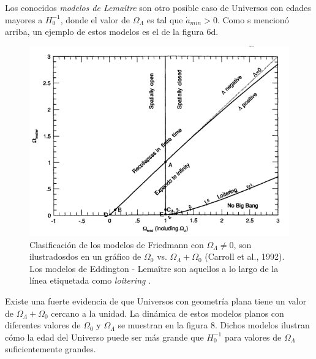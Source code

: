\documentclass[11pt]{article}
\begin{document}
{\begin{itemize}
       Los conocidos {\textit{modelos de Lema\^itre}} son otro posible caso de Universos con edades mayores a $H_0^{-1}$, donde el valor de $\Omega_{\Lambda}$ es tal que $\dot{a}_{min} >0$. Como s mencionó arriba, un ejemplo de estos modelos es el de la figura 6d. 
    \end{itemize}
    
    
    \begin{figure}[H]         
     \centering
     \includegraphics[width=1.0\textwidth]{friedmann_worldspp228_Malcolm.png}
        \caption{\footnotesize{Clasificación de los modelos de Friedmann con $\Omega_{\Lambda} \neq 0$, son ilustradosdos en un gráfico de $\Omega_0$ vs. $\Omega_{\Lambda} + \Omega_0$ (Carroll et al., 1992). Los modelos de Eddington - Lema\^itre son aquellos a lo largo de la línea etiquetada como {\textit{loitering} }.}}
     \end{figure}
    
    Existe una fuerte evidencia de que Universos con geometría plana tiene un valor de $\Omega_{\Lambda} + \Omega_0$ cercano a la unidad. La dinámica de estos modelos planos con diferentes valores de $\Omega_0$ y $\Omega_{\Lambda}$ se muestran en la figura 8. Dichos modelos ilustran cómo la edad del Universo puede ser más grande que $H_0^{-1}$ para valores de $\Omega_{\Lambda}$ suficientemente grandes. 
    
}
\end{document}
